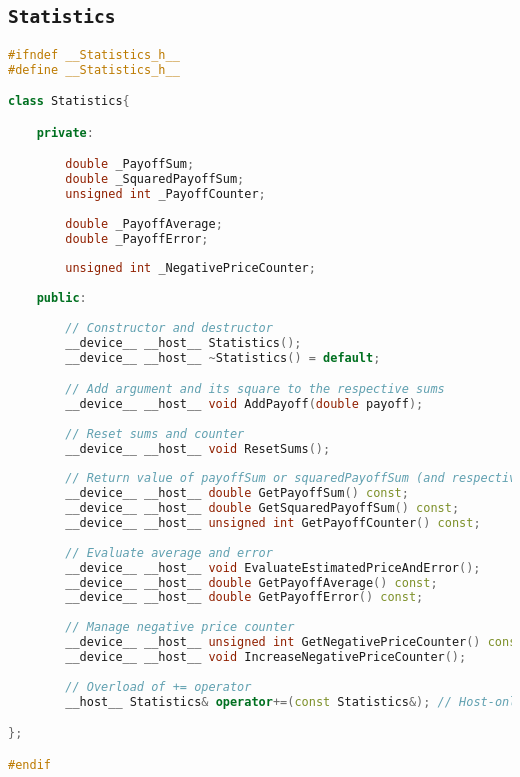 \subsection{\texttt{Statistics}}
\lipsum[1-3]

\begin{lstlisting}[language=C++, caption={\texttt{libraries/CoreLibraries/Statistics/Statistics.cuh}}]
#ifndef __Statistics_h__
#define __Statistics_h__

class Statistics{

	private:

		double _PayoffSum;
		double _SquaredPayoffSum;
		unsigned int _PayoffCounter;
		
		double _PayoffAverage;
		double _PayoffError;
		
		unsigned int _NegativePriceCounter;
		
	public:
	
		// Constructor and destructor
		__device__ __host__ Statistics();
		__device__ __host__ ~Statistics() = default;

		// Add argument and its square to the respective sums
		__device__ __host__ void AddPayoff(double payoff);
		
		// Reset sums and counter
		__device__ __host__ void ResetSums();
				
		// Return value of payoffSum or squaredPayoffSum (and respective counters)
		__device__ __host__ double GetPayoffSum() const;
		__device__ __host__ double GetSquaredPayoffSum() const;
		__device__ __host__ unsigned int GetPayoffCounter() const;
		
		// Evaluate average and error
		__device__ __host__ void EvaluateEstimatedPriceAndError();
		__device__ __host__ double GetPayoffAverage() const;
		__device__ __host__ double GetPayoffError() const;
		
		// Manage negative price counter
		__device__ __host__ unsigned int GetNegativePriceCounter() const;
		__device__ __host__ void IncreaseNegativePriceCounter();
		
		// Overload of += operator
		__host__ Statistics& operator+=(const Statistics&);	// Host-only because of isinf, at least for now

};

#endif
\end{lstlisting}

